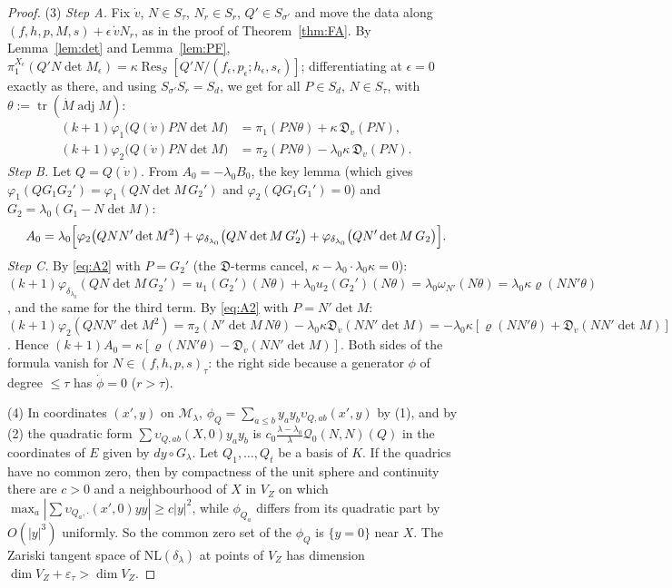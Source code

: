 \documentclass[11pt]{article}
\numberwithin{equation}{section}
\theoremstyle{remark}
\newcommand{\NL}{\mathrm{NL}}
\newcommand{\VZ}{V_Z}
\newcommand{\cM}{\mathcal{M}}
\newcommand{\Res}{\operatorname{Res}}
\newcommand{\lz}{\lambda_0}
\newcommand{\et}{\varepsilon_\tau}
\begin{document}
\begin{proof}
(3) \emph{Step A.} Fix $\dot v$, $N\in S_\tau$, $N_r\in S_r$, $Q'\in S_{\sigma'}$ and move the data along
$(f,h,p,M,s)+\epsilon\,\dot vN_r$, as in the proof of Theorem~\ref{thm:FA}. By Lemma~\ref{lem:det} and Lemma~\ref{lem:PF},
$\pi_1^{X_\epsilon}(Q'N\det M_\epsilon)=\kappa\Res_S[Q'N/(f_\epsilon,p_\epsilon;h_\epsilon,s_\epsilon)]$; differentiating
at $\epsilon=0$ exactly as there, and using $S_{\sigma'}S_r=S_d$, we get for all $P\in S_d$, $N\in S_\tau$, with
$\theta:=\operatorname{tr}(\dot M\operatorname{adj}M)$:
\begin{equation}\label{eq:A2}
\begin{aligned}
(k+1)\varphi_1\bigl(Q(\dot v)PN\det M\bigr)&=\pi_1(PN\theta)+\kappa\,\mathfrak D_{\dot v}(PN),\\
(k+1)\varphi_2\bigl(Q(\dot v)PN\det M\bigr)&=\pi_2(PN\theta)-\lz\kappa\,\mathfrak D_{\dot v}(PN).
\end{aligned}
\end{equation}
\emph{Step B.} Let $Q=Q(\dot v)$. From $A_0=-\lz B_0$, the key lemma (which gives
$\varphi_1(QG_1G_2')=\varphi_1(QN\det M\,G_2')$ and $\varphi_2(QG_1G_1')=0$) and $G_2=\lz(G_1-N\det M)$:
\[
A_0=\lz\Bigl[\varphi_2\bigl(QNN'\det M^2\bigr)+\varphi_{\delta_{\lz}}\bigl(QN\det M\,G_2'\bigr)
+\varphi_{\delta_{\lz}}\bigl(QN'\det M\,G_2\bigr)\Bigr].
\]
\emph{Step C.} By \eqref{eq:A2} with $P=G_2'$ (the $\mathfrak D$-terms cancel, $\kappa-\lz\cdot\lz\kappa=0$):
$(k+1)\varphi_{\delta_{\lz}}(QN\det M\,G_2')=u_1(G_2')(N\theta)+\lz u_2(G_2')(N\theta)=\lz\omega_{N'}(N\theta)
=\lz\kappa\varrho(NN'\theta)$, and the same for the third term. By \eqref{eq:A2} with $P=N'\det M$:
$(k+1)\varphi_2(QNN'\det M^2)=\pi_2(N'\det M\,N\theta)-\lz\kappa\mathfrak D_{\dot v}(NN'\det M)
=-\lz\kappa[\varrho(NN'\theta)+\mathfrak D_{\dot v}(NN'\det M)]$. Hence
$(k+1)A_0=\kappa[\varrho(NN'\theta)-\mathfrak D_{\dot v}(NN'\det M)]$. Both sides of the formula vanish for
$N\in(f,h,p,s)_\tau$: the right side because a generator $\phi$ of degree $\le\tau$ has $\dot\phi=0$ ($r>\tau$).

(4) In coordinates $(x',y)$ on $\cM_\lambda$, $\phi_Q=\sum_{a\le b}y_ay_b\upsilon_{Q,ab}(x',y)$ by (1), and by (2)
the quadratic form $\sum\upsilon_{Q,ab}(X,0)y_ay_b$ is $c_0\frac{\lambda-\lz}{\lambda}\mathcal Q_0(N,N)(Q)$ in the
coordinates of $E$ given by $dy\circ G_\lambda$. Let $Q_1,\dots,Q_t$ be a basis of $K$. If the quadrics have no
common zero, then by compactness of the unit sphere and continuity there are $c>0$ and a neighbourhood of $X$ in
$\VZ$ on which $\max_a|\sum\upsilon_{Q_a,\cdot}(x',0)yy|\ge c|y|^2$, while $\phi_{Q_a}$ differs from its quadratic
part by $O(|y|^3)$ uniformly. So the common zero set of the $\phi_Q$ is $\{y=0\}$ near $X$. The Zariski tangent
space of $\NL(\delta_\lambda)$ at points of $\VZ$ has dimension $\dim\VZ+\et>\dim\VZ$.
\end{proof}
\end{document}
